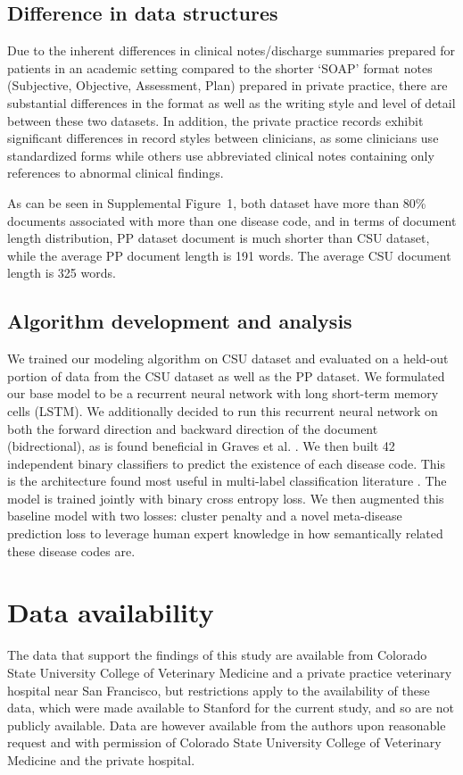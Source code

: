 \documentclass{article}[11pt,oneside]
\begin{document}
\subsection*{Difference in data structures}
Due to the inherent differences in clinical notes/discharge summaries prepared for patients in an academic setting compared to the shorter `SOAP' format notes (Subjective, Objective, Assessment, Plan) prepared in private practice, there are substantial differences in the format as well as the writing style and level of detail between these two datasets. In addition, the private practice records exhibit significant differences in record styles between clinicians, as some clinicians use standardized forms while others use abbreviated clinical notes containing only references to abnormal clinical findings. 

As can be seen in Supplemental Figure~1, both dataset have more than 80\% documents associated with more than one disease code, and in terms of document length distribution, PP dataset document is much shorter than CSU dataset, while the average PP document length is 191 words. The average CSU document length is 325 words.

\subsection*{Algorithm development and analysis}

We trained our modeling algorithm on CSU dataset and evaluated on a held-out portion of data from the CSU dataset as well as the PP dataset. 
We formulated our base model to be a recurrent neural network with long short-term memory cells (LSTM). We additionally decided to run this recurrent neural network on both the forward direction and backward direction of the document (bidrectional), as is found beneficial in Graves et al. \cite{graves2005bidirectional}. We then built 42 independent binary classifiers to predict the existence of each disease code. This is the architecture found most useful in multi-label classification literature \cite{kavuluru2015empirical}. The model is trained jointly with binary cross entropy loss. We then augmented this baseline model with two losses: cluster penalty \cite{jacob2009clustered} and a novel meta-disease prediction loss to leverage human expert knowledge in how semantically related these disease codes are.

\section*{Data availability}
The data that support the findings of this study are available from Colorado State University College of Veterinary Medicine and a private practice veterinary hospital near San Francisco, but restrictions apply to the availability of these data,
which were made available to Stanford for the current study, and so are not publicly available. Data are however available from the authors upon
reasonable request and with permission of Colorado State University College of Veterinary Medicine and the private hospital.
\end{document}
